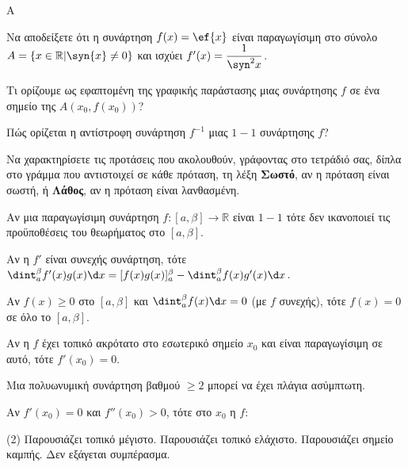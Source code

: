 \begin{thema}{A}
\begin{erwthma}
    \item Να αποδείξετε ότι η συνάρτηση $ f(x)=\ef{x} $ είναι παραγωγίσιμη στο σύνολο $ A=\{x\in\mathbb{R}|\syn{x}\neq 0\} $ και ισχύει $ f'(x)=\dfrac{1}{\syn^2{x}} $.
    \item Τι ορίζουμε ως εφαπτομένη της γραφικής παράστασης μιας συνάρτησης $f$ σε ένα σημείο της $A(x_0, f(x_0))$?
    \item Πώς ορίζεται η αντίστροφη συνάρτηση $f^{-1}$ μιας $1-1$ συνάρτησης $f$?
    \item Να χαρακτηρίσετε τις προτάσεις που ακολουθούν, γράφοντας στο τετράδιό σας, δίπλα στο γράμμα που αντιστοιχεί σε κάθε πρόταση, τη λέξη \textbf{Σωστό}, αν η πρόταση είναι σωστή, ή \textbf{Λάθος}, αν η πρόταση είναι λανθασμένη.
    \begin{alist}
        \item Αν μια παραγωγίσιμη συνάρτηση $f:[a,\beta]\to\mathbb{R}$ είναι $1-1$ τότε δεν ικανοποιεί τις προϋποθέσεις του θεωρήματος  στο $[a,\beta]$.
        \item Αν η $f'$ είναι συνεχής συνάρτηση, τότε $\dint_{a}^{\beta} f'(x)g(x)\d x = [f(x)g(x)]_{a}^{\beta} - \dint_{a}^{\beta} f(x)g'(x)\d x$.
        \item Αν $f(x) \ge 0$ στο $[a, \beta]$ και $\dint_a^\beta f(x)\d x = 0$ (με $f$ συνεχής), τότε $f(x) = 0$ σε όλο το $[a, \beta]$.
        \item Αν η $f$ έχει τοπικό ακρότατο στο εσωτερικό σημείο $x_0$ και είναι παραγωγίσιμη σε αυτό, τότε $f'(x_0) = 0$.
        \item Μια πολυωνυμική συνάρτηση βαθμού $\ge 2$ μπορεί να έχει πλάγια ασύμπτωτη.
    \end{alist}
    \item Αν $f'(x_0) = 0$ και $f''(x_0) > 0$, τότε στο $x_0$ η $f$:
    \begin{tasks}[label=\let\textdexiakeraia\relax\alph*.](2)
        \task Παρουσιάζει τοπικό μέγιστο.
        \task Παρουσιάζει τοπικό ελάχιστο.
        \task Παρουσιάζει σημείο καμπής.
        \task Δεν εξάγεται συμπέρασμα.
    \end{tasks}
\end{erwthma}
\end{thema}


